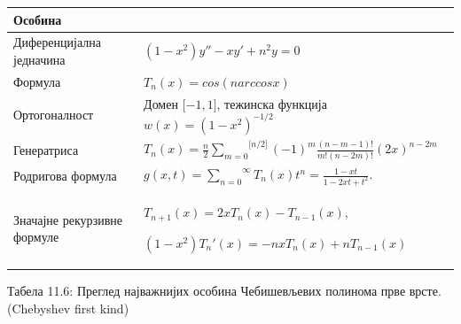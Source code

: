 {\def\LTcaptype{none} %
\begin{longtable}[]{@{}
  >{\raggedright\arraybackslash}p{}
  >{\centering\arraybackslash}p{}@{}}
\toprule\noalign{}
\begin{minipage}[b]{\linewidth}\raggedright
Особина
\end{minipage} & \begin{minipage}[b]{\linewidth}\centering
\end{minipage} \\
\midrule\noalign{}
\endhead
\bottomrule\noalign{}
\endlastfoot
Диференцијална једначина & \((1 - x^{2})y'' - xy' + n^{2}y = 0\) \\
Формула & \(T_{n}(x) = cos(narccosx)\) \\
Ортогоналност & Домен \(\lbrack - 1,1\rbrack\), тежинска функција
\(w(x) = {(1 - x^{2})}^{- 1/2}\) \\
Генератриса &
\(T_{n}(x) = \frac{n}{2}\overset{\lbrack n/2\rbrack}{\sum_{m = 0}}{( - 1)}^{m}\frac{(n - m - 1)!}{m!(n - 2m)!}{(2x)}^{n - 2m}\) \\
Родригова формула &
\(g(x,t) = \overset{\infty}{\sum_{n = 0}}T_{n}(x)t^{n} = \frac{1 - xt}{1 - 2xt + t^{2}}\). \\
Значајне рекурзивне формуле &
\(T_{n + 1}(x) = 2xT_{n}(x) - T_{n - 1}(x)\),

\((1 - x^{2})T_{n}'(x) = - nxT_{n}(x) + nT_{n - 1}(x)\) \\
\end{longtable}
}

Табела 11.6: Преглед најважнијих особина Чебишевљевих полинома прве
врсте. (Chebyshev first kind)

